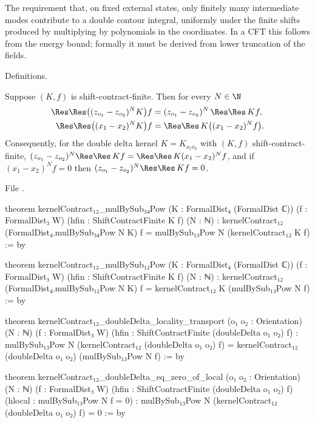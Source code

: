 \begin{physics}
The requirement that, on fixed external states, only finitely many intermediate modes contribute to a double contour
integral, uniformly under the finite shifts produced by multiplying by polynomials in the coordinates. In a CFT this
follows from the energy bound; formally it must be derived from lower truncation of the fields.
\end{physics}

\begin{status}
Definitions.
\end{status}

\begin{theorem}\label{l01:thm:transport}
Suppose $(K,f)$ is shift-contract-finite. Then for every $N\in\N$
\begin{align*}
  \Res\Res\big((z_{o_1}-z_{o_2})^NK\big)f &= (z_{o_1}-z_{o_2})^N\,\Res\Res\,Kf,\\
  \Res\Res\big((x_1-x_2)^NK\big)f &= \Res\Res\,K\big((x_1-x_2)^Nf\big).
\end{align*}
Consequently, for the double delta kernel $K = K_{o_1o_2}$ with $(K,f)$ shift-contract-finite,
$(z_{o_1}-z_{o_2})^N\Res\Res\,Kf = \Res\Res\,K(x_1-x_2)^Nf$, and if $(x_1-x_2)^Nf = 0$ then
$(z_{o_1}-z_{o_2})^N\Res\Res\,Kf = 0$.
\end{theorem}

\noindent File .
\begin{leancode}
theorem kernelContract₁₂_mulBySub₃₄Pow (K : FormalDist₄ (FormalDist ℂ))
    (f : FormalDist₃ W) (hfin : ShiftContractFinite K f) (N : ℕ) :
    kernelContract₁₂ (FormalDist₄.mulBySub₃₄Pow N K) f =
      mulBySub₁₃Pow N (kernelContract₁₂ K f) := by

theorem kernelContract₁₂_mulBySub₁₂Pow (K : FormalDist₄ (FormalDist ℂ))
    (f : FormalDist₃ W) (hfin : ShiftContractFinite K f) (N : ℕ) :
    kernelContract₁₂ (FormalDist₄.mulBySub₁₂Pow N K) f =
      kernelContract₁₂ K (mulBySub₁₃Pow N f) := by

theorem kernelContract₁₂_doubleDelta_locality_transport (o₁ o₂ : Orientation)
    (N : ℕ) (f : FormalDist₃ W)
    (hfin : ShiftContractFinite (doubleDelta o₁ o₂) f) :
    mulBySub₁₃Pow N (kernelContract₁₂ (doubleDelta o₁ o₂) f) =
      kernelContract₁₂ (doubleDelta o₁ o₂) (mulBySub₁₃Pow N f) := by

theorem kernelContract₁₂_doubleDelta_eq_zero_of_local (o₁ o₂ : Orientation)
    (N : ℕ) (f : FormalDist₃ W)
    (hfin : ShiftContractFinite (doubleDelta o₁ o₂) f)
    (hlocal : mulBySub₁₃Pow N f = 0) :
    mulBySub₁₃Pow N (kernelContract₁₂ (doubleDelta o₁ o₂) f) = 0 := by
\end{leancode}

